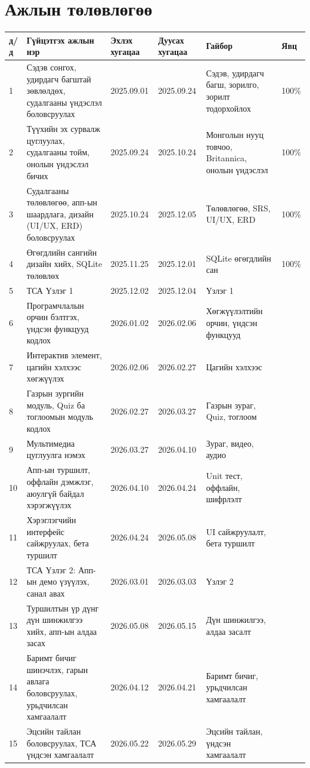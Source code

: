 \setlength{\headheight}{14.92621pt}
\newpage
\thispagestyle{empty}

\section*{Ажлын төлөвлөгөө}

\begin{table}[h]
\centering
\small
\begin{tabular}{|p{0.8cm}|p{5.5cm}|p{2cm}|p{2cm}|p{3cm}|p{1cm}|}
\hline
\textbf{д/д} & \textbf{Гүйцэтгэх ажлын нэр} & \textbf{Эхлэх хугацаа} & \textbf{Дуусах хугацаа} & \textbf{Гайбор} & \textbf{Явц} \\
\hline
1 & Сэдэв сонгох, удирдагч багштай зөвлөлдөх, судалгааны үндэслэл боловсруулах & 2025.09.01 & 2025.09.24 & Сэдэв, удирдагч багш, зорилго, зорилт тодорхойлох & 100\% \\
\hline
2 & Түүхийн эх сурвалж цуглуулах, судалгааны тойм, онолын үндэслэл бичих & 2025.09.24 & 2025.10.24 & Монголын нууц товчоо, Britannica, онолын үндэслэл & 100\% \\
\hline
3 & Судалгааны төлөвлөгөө, апп-ын шаардлага, дизайн (UI/UX, ERD) боловсруулах & 2025.10.24 & 2025.12.05 & Төлөвлөгөө, SRS, UI/UX, ERD & 100\% \\
\hline
4 & Өгөгдлийн сангийн дизайн хийх, SQLite төлөвлөх & 2025.11.25& 2025.12.01& SQLite өгөгдлийн сан & 100\% \\
\hline
5 & ТСА Үзлэг 1 & 2025.12.02 & 2025.12.04 & Үзлэг 1 &  \\
\hline
6 & Програмчлалын орчин бэлтгэх, үндсэн функцууд кодлох & 2026.01.02 & 2026.02.06 & Хөгжүүлэлтийн орчин, үндсэн функцууд & \\
\hline
7 & Интерактив элемент, цагийн хэлхээс хөгжүүлэх & 2026.02.06 & 2026.02.27 & Цагийн хэлхээс &  \\
\hline
8 & Газрын зургийн модуль, Quiz ба тоглоомын модуль кодлох & 2026.02.27 & 2026.03.27 & Газрын зураг, Quiz, тоглоом &  \\
\hline
9 & Мультимедиа цуглуулга нэмэх & 2026.03.27 & 2026.04.10 & Зураг, видео, аудио & \\
\hline
10 & Апп-ын туршилт, оффлайн дэмжлэг, аюулгүй байдал хэрэгжүүлэх & 2026.04.10 & 2026.04.24 & Unit тест, оффлайн, шифрлэлт & \\
\hline
11 & Хэрэглэгчийн интерфейс сайжруулах, бета туршилт & 2026.04.24 & 2026.05.08 & UI сайжруулалт, бета туршилт & \\
\hline
12 & ТСА Үзлэг 2: Апп-ын демо үзүүлэх, санал авах & 2026.03.01& 2026.03.03& Үзлэг 2 &  \\
\hline
13 & Туршилтын үр дүнг дүн шинжилгээ хийх, апп-ын алдаа засах & 2026.05.08 & 2026.05.15 & Дүн шинжилгээ, алдаа засалт &  \\
\hline
14 & Баримт бичиг шинэчлэх, гарын авлага боловсруулах, урьдчилсан хамгаалалт & 2026.04.12 & 2026.04.21  & Баримт бичиг, урьдчилсан хамгаалалт & \\
\hline
15 & Эцсийн тайлан боловсруулах, ТСА үндсэн хамгаалалт & 2026.05.22 & 2026.05.29& Эцсийн тайлан, үндсэн хамгаалалт & \\
\hline
\end{tabular}
\end{table}

